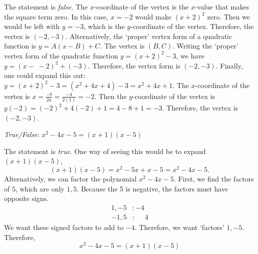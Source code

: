 \documentclass[11pt,letterpaper]{article}
\begin{document}
\sol The statement is \textit{false}. The $x$-coordinate of the vertex is the $x$-value that makes the square term zero. In this case, $x= -2$ would make $(x + 2)^2$ zero. Then we would be left with $y= -3$, which is the $y$-coordinate of the vertex. Therefore, the vertex is $(-2, -3)$. Alternatively, the `proper' vertex form of a quadratic function is $y= A(x - B) + C$. The vertex is $(B, C)$. Writing the `proper' vertex form of the quadratic function $y= (x + 2)^2 - 3$, we have $y= (x - \;-2)^2 + (-3)$. Therefore, the vertex form is $(-2, -3)$. Finally, one could expand this out: $y= (x + 2)^2 - 3= (x^2 + 4x + 4) - 3= x^2 + 4x + 1$. The $x$-coordinate of the vertex is $x= \frac{-b}{2a}= \frac{-4}{2(1)}= -2$. Then the $y$-coordinate of the vertex is $y(-2)= (-2)^2 + 4(-2) + 1= 4 - 8 + 1= -3$. Therefore, the vertex is $(-2, -3)$. \pvspace{1.3cm}



\quizsol \textit{True/False}: $x^2 - 4x - 5= (x + 1)(x - 5)$ \pspace

\sol The statement is \textit{true}. One way of seeing this would be to expand $(x + 1)(x - 5)$,
	\[
	(x + 1)(x - 5)= x^2 - 5x + x - 5= x^2 - 4x - 5.
	\]
Alternatively, we can factor the polynomial $x^2 - 4x - 5$. First, we find the factors of $5$, which are only $1, 5$. Because the 5 is negative, the factors must have opposite signs. 
	\[
	\begin{aligned}
	1, -5&\colon -4 \\
	-1, 5&\colon \phantom{-..}4
	\end{aligned}
	\]
We want these signed factors to add to $-4$. Therefore, we want `factors' $1, -5$. Therefore, 
	\[
	x^2 - 4x - 5= (x + 1)(x - 5)
	\]



\newpage
\end{document}
